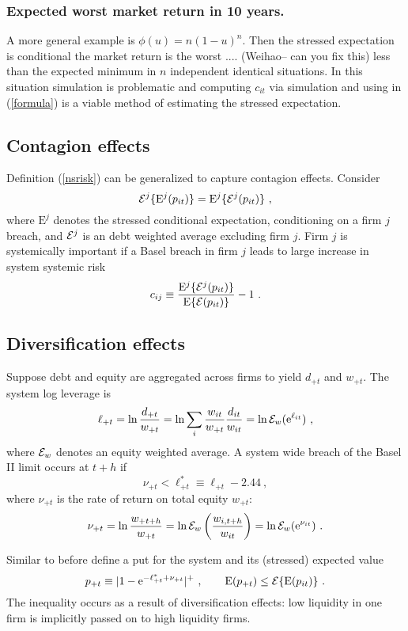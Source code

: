 \documentclass[authoryear]{elsarticle}
\newcommand{\E}{\mathrm{E}}
\newcommand{\e}{\mathrm{e}}
\newcommand{\Ex}{{\cal E}}
\newcommand{\eref}[1]{(\ref{#1})}
\newcommand{\cq}{\ , \qquad}
\newcommand{\be}[1]{\begin{equation}\label{#1}}
\newcommand{\ee}{\end{equation}}
\begin{document}
\subsubsection{Expected worst market return in 10 years.} 
 A more general example is $\phi(u)=n(1-u)^n$.  Then the stressed expectation is conditional the market return is the worst .... (Weihao-- can you fix this)  less than the expected minimum in $n$ independent identical situations.   In this situation simulation is problematic and computing $c_{it}$ via simulation  and using in  \eref{formula} is a viable method of estimating the stressed expectation.

 

\subsection{Contagion effects}
Definition \eref{nsrisk} can be generalized to capture contagion effects.  Consider 
\be{cont}
\Ex^j\{\E^j(p_{it})\}=\E^j\{\Ex^j(p_{it})\}\ ,
\ee
where  $\E^j$ denotes the stressed conditional expectation, conditioning on a firm $j$ breach, and $\Ex^j$ is an debt weighted average excluding firm $j$.  Firm $j$ is systemically important  if a Basel breach in firm $j$ leads to large increase in system systemic risk
$$
c_{ij}\equiv \frac{\E^j\{\Ex^j(p_{it})\}}{\E\{\Ex(p_{it})\}}-1\ .
$$

\subsection{Diversification effects} 

Suppose debt and equity are  aggregated across firms to yield $d_{+t}$ and $w_{+t}$.  The system log leverage is  
$$
\ell_{+t} =  \ln \frac{d_{+t}}{w_{+t}} =  \ln \sum_i\frac{w_{it}}{w_{+t}}\frac{ d_{it}}{ w_{it}} = \ln \Ex_w(\e^{\ell_{it}}) \ ,
$$
where $\Ex_w$ denotes an equity weighted average.  A system wide breach of the Basel II limit occurs at $t+h$ if
$$
\nu_{+t} < \ell_{+t}^*\equiv \ell_{+t} - 2.44 \ ,
$$
where $\nu_{+t}$ is the rate of return on total equity $w_{+t}$:
\be{ew}
 \nu_{+t} = \ln \frac{w_{+t+h}}{w_{+t}} = \ln \Ex_w\left(\frac{w_{i,t+h}}{w_{it}}\right) = \ln \Ex_w(\e^{\nu_{it}})\ . 
\ee

Similar to before define a put for the system and its (stressed) expected value
$$
p_{+t}\equiv |1-\e^{-\ell_{+t}^*+\nu_{+t}}|^+\cq \E(p_{+t})\le\Ex\{\E(p_{it})\}\ .
$$
The inequality occurs as a result  of diversification effects:   low liquidity  in one firm is implicitly passed on to high liquidity  firms.
\end{document}
